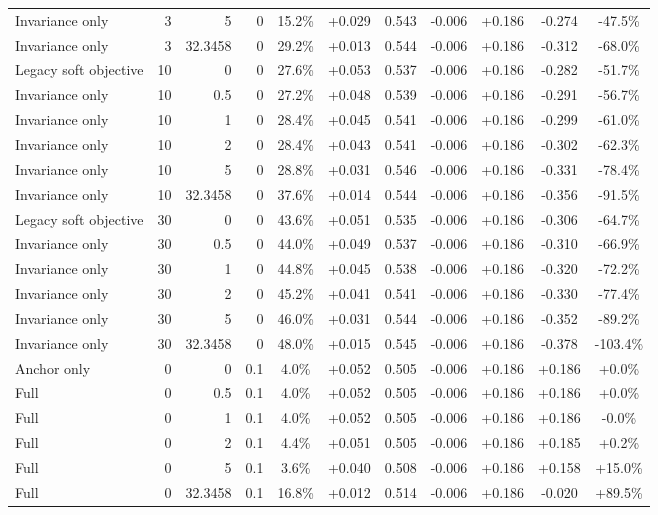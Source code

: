 \begin{table}[htbp]
\begin{tabular}{lrrrccccccc}
Invariance only & 3 & 5 & 0 & 15.2\% & +0.029 & 0.543 & -0.006 & +0.186 & -0.274 & -47.5\% \\
Invariance only & 3 & 32.3458 & 0 & 29.2\% & +0.013 & 0.544 & -0.006 & +0.186 & -0.312 & -68.0\% \\
Legacy soft objective & 10 & 0 & 0 & 27.6\% & +0.053 & 0.537 & -0.006 & +0.186 & -0.282 & -51.7\% \\
Invariance only & 10 & 0.5 & 0 & 27.2\% & +0.048 & 0.539 & -0.006 & +0.186 & -0.291 & -56.7\% \\
Invariance only & 10 & 1 & 0 & 28.4\% & +0.045 & 0.541 & -0.006 & +0.186 & -0.299 & -61.0\% \\
Invariance only & 10 & 2 & 0 & 28.4\% & +0.043 & 0.541 & -0.006 & +0.186 & -0.302 & -62.3\% \\
Invariance only & 10 & 5 & 0 & 28.8\% & +0.031 & 0.546 & -0.006 & +0.186 & -0.331 & -78.4\% \\
Invariance only & 10 & 32.3458 & 0 & 37.6\% & +0.014 & 0.544 & -0.006 & +0.186 & -0.356 & -91.5\% \\
Legacy soft objective & 30 & 0 & 0 & 43.6\% & +0.051 & 0.535 & -0.006 & +0.186 & -0.306 & -64.7\% \\
Invariance only & 30 & 0.5 & 0 & 44.0\% & +0.049 & 0.537 & -0.006 & +0.186 & -0.310 & -66.9\% \\
Invariance only & 30 & 1 & 0 & 44.8\% & +0.045 & 0.538 & -0.006 & +0.186 & -0.320 & -72.2\% \\
Invariance only & 30 & 2 & 0 & 45.2\% & +0.041 & 0.541 & -0.006 & +0.186 & -0.330 & -77.4\% \\
Invariance only & 30 & 5 & 0 & 46.0\% & +0.031 & 0.544 & -0.006 & +0.186 & -0.352 & -89.2\% \\
Invariance only & 30 & 32.3458 & 0 & 48.0\% & +0.015 & 0.545 & -0.006 & +0.186 & -0.378 & -103.4\% \\
Anchor only & 0 & 0 & 0.1 & 4.0\% & +0.052 & 0.505 & -0.006 & +0.186 & +0.186 & +0.0\% \\
Full & 0 & 0.5 & 0.1 & 4.0\% & +0.052 & 0.505 & -0.006 & +0.186 & +0.186 & +0.0\% \\
Full & 0 & 1 & 0.1 & 4.0\% & +0.052 & 0.505 & -0.006 & +0.186 & +0.186 & -0.0\% \\
Full & 0 & 2 & 0.1 & 4.4\% & +0.051 & 0.505 & -0.006 & +0.186 & +0.185 & +0.2\% \\
Full & 0 & 5 & 0.1 & 3.6\% & +0.040 & 0.508 & -0.006 & +0.186 & +0.158 & +15.0\% \\
Full & 0 & 32.3458 & 0.1 & 16.8\% & +0.012 & 0.514 & -0.006 & +0.186 & -0.020 & +89.5\% \\

\end{tabular}
\end{table}

